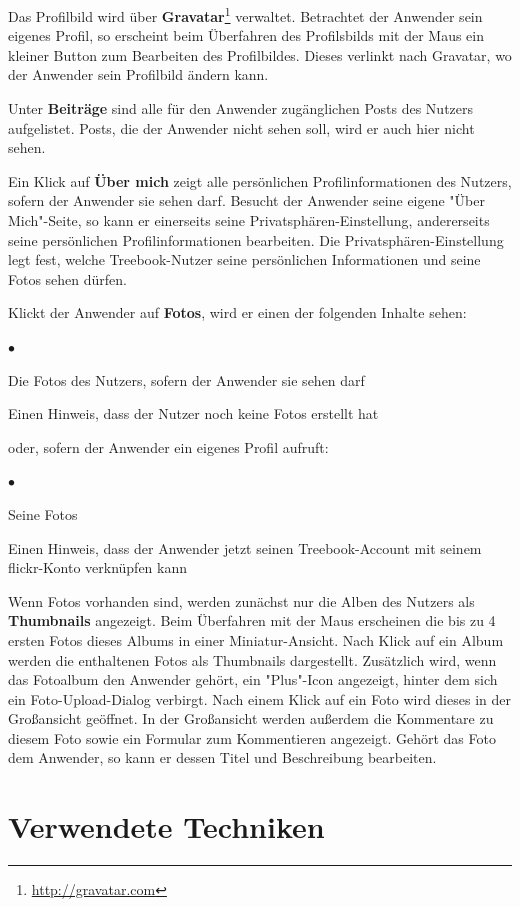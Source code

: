 \documentclass[10pt,a4paper]{book}
\begin{document}
Das Profilbild wird über \textbf{Gravatar}\footnote{\href{http://gravatar.com}{http://gravatar.com}} verwaltet. Betrachtet der Anwender sein eigenes Profil, so erscheint beim Überfahren des Profilsbilds mit der Maus ein kleiner Button zum Bearbeiten des Profilbildes. Dieses verlinkt nach Gravatar, wo der Anwender sein Profilbild ändern kann.

Unter \textbf{Beiträge} sind alle für den Anwender zugänglichen Posts des Nutzers aufgelistet. Posts, die der Anwender nicht sehen soll, wird er auch hier nicht sehen.

Ein Klick auf \textbf{Über mich} zeigt alle persönlichen Profilinformationen des Nutzers, sofern der Anwender sie sehen darf. Besucht der Anwender seine eigene "Über Mich"-Seite, so kann er einerseits seine Privatsphären-Einstellung, andererseits seine persönlichen Profilinformationen bearbeiten.
Die Privatsphären-Einstellung legt fest, welche Treebook-Nutzer seine persönlichen Informationen und seine Fotos sehen dürfen.

Klickt der Anwender auf \textbf{Fotos}, wird er einen der folgenden Inhalte sehen:
\begin{list}{$\bullet$}{}
\item Die Fotos des Nutzers, sofern der Anwender sie sehen darf
\item Einen Hinweis, dass der Nutzer noch keine Fotos erstellt hat
\end{list}
oder, sofern der Anwender ein eigenes Profil aufruft:
\begin{list}{$\bullet$}{}
\item Seine Fotos
\item Einen Hinweis, dass der Anwender jetzt seinen Treebook-Account mit seinem flickr-Konto verknüpfen kann
\end{list}
Wenn Fotos vorhanden sind, werden zunächst nur die Alben des Nutzers als \textbf{Thumbnails} angezeigt. Beim Überfahren mit der Maus erscheinen die bis zu 4 ersten Fotos dieses Albums in einer Miniatur-Ansicht.
Nach Klick auf ein Album werden die enthaltenen Fotos als Thumbnails dargestellt. Zusätzlich wird, wenn das Fotoalbum den Anwender gehört, ein "Plus"-Icon angezeigt, hinter dem sich ein Foto-Upload-Dialog verbirgt.
Nach einem Klick auf ein Foto wird dieses in der Großansicht geöffnet.
In der Großansicht werden außerdem die Kommentare zu diesem Foto sowie ein Formular zum Kommentieren angezeigt. Gehört das Foto dem Anwender, so kann er dessen Titel und Beschreibung bearbeiten.
\section{Verwendete Techniken}
\end{document}
